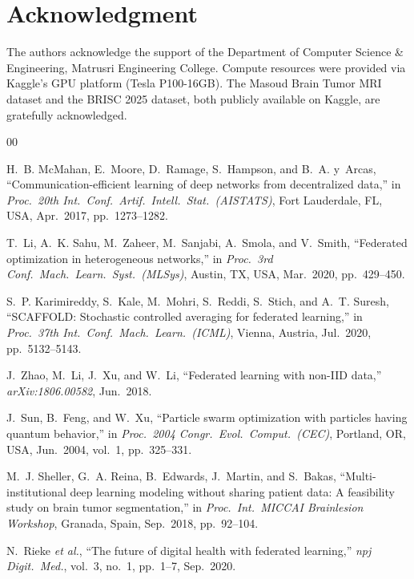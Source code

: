 \documentclass[conference]{IEEEtran}
\begin{document}
\section*{Acknowledgment}
The authors acknowledge the support of the Department of Computer Science \&
Engineering, Matrusri Engineering College. Compute resources were provided via
Kaggle's GPU platform (Tesla P100-16GB). The Masoud Brain Tumor MRI dataset
and the BRISC 2025 dataset, both publicly available on Kaggle, are gratefully
acknowledged.

\begin{thebibliography}{00}

H.~B. McMahan, E.~Moore, D.~Ramage, S.~Hampson, and B.~A. y~Arcas,
``Communication-efficient learning of deep networks from decentralized data,''
in \textit{Proc.\ 20th Int.\ Conf.\ Artif.\ Intell.\ Stat.\ (AISTATS)},
Fort Lauderdale, FL, USA, Apr.\ 2017, pp.~1273--1282.

T.~Li, A.~K. Sahu, M.~Zaheer, M.~Sanjabi, A.~Smola, and V.~Smith,
``Federated optimization in heterogeneous networks,''
in \textit{Proc.\ 3rd Conf.\ Mach.\ Learn.\ Syst.\ (MLSys)}, Austin, TX, USA,
Mar.\ 2020, pp.~429--450.

S.~P. Karimireddy, S.~Kale, M.~Mohri, S.~Reddi, S.~Stich, and A.~T. Suresh,
``SCAFFOLD: Stochastic controlled averaging for federated learning,''
in \textit{Proc.\ 37th Int.\ Conf.\ Mach.\ Learn.\ (ICML)}, Vienna, Austria,
Jul.\ 2020, pp.~5132--5143.

J.~Zhao, M.~Li, J.~Xu, and W.~Li,
``Federated learning with non-IID data,''
\textit{arXiv:1806.00582}, Jun.\ 2018.

J.~Sun, B.~Feng, and W.~Xu,
``Particle swarm optimization with particles having quantum behavior,''
in \textit{Proc.\ 2004 Congr.\ Evol.\ Comput.\ (CEC)}, Portland, OR, USA,
Jun.\ 2004, vol.~1, pp.~325--331.

M.~J. Sheller, G.~A. Reina, B.~Edwards, J.~Martin, and S.~Bakas,
``Multi-institutional deep learning modeling without sharing patient data:
A feasibility study on brain tumor segmentation,''
in \textit{Proc.\ Int.\ MICCAI Brainlesion Workshop}, Granada, Spain,
Sep.\ 2018, pp.~92--104.

N.~Rieke \textit{et al.},
``The future of digital health with federated learning,''
\textit{npj Digit.\ Med.}, vol.~3, no.~1, pp.~1--7, Sep.\ 2020.


\end{thebibliography}
\end{document}
